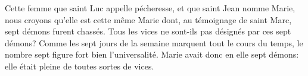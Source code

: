  Cette femme que saint Luc appelle pécheresse, et que saint Jean nomme Marie,
	nous croyons qu’elle est cette même Marie
	dont, au témoignage de saint Marc, sept démons furent chassés.
Tous les vices ne sont-ils pas désignés par ces sept démons?
	Comme les sept jours de la semaine marquent tout le cours du temps,
	le nombre sept figure fort bien l’universalité.
Marie avait donc en elle sept démons:
	elle était pleine de toutes sortes de vices.
